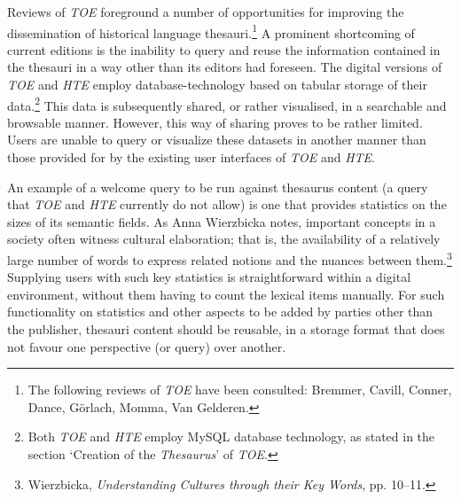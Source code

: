 Reviews of \textit{TOE} foreground a number of opportunities for improving the dissemination of historical language thesauri.\footnote{The following reviews of \textit{TOE} have been consulted: Bremmer, Cavill, Conner, Dance, Görlach, Momma, Van Gelderen.} A prominent shortcoming of current editions is the inability to query and reuse the information contained in the thesauri in a way other than its editors had foreseen. The digital versions of \textit{TOE} and \textit{HTE} employ database-technology based on tabular storage of their data.\footnote{Both \textit{TOE} and \textit{HTE} employ MySQL database technology, as stated in the section `Creation of the \textit{Thesaurus}' of \textit{TOE}.} This data is subsequently shared, or rather visualised, in a searchable and browsable manner. However, this way of sharing proves to be rather limited. 
Users are unable to query or visualize these datasets in another manner than those provided for by the existing user interfaces of \textit{TOE} and \textit{HTE}. 

An example of a welcome query to be run against thesaurus content (a query that \textit{TOE} and \textit{HTE} currently do not allow) is one that provides statistics on the sizes of its semantic fields. As Anna Wierzbicka notes, important concepts in a society often witness cultural elaboration; that is, the availability of a relatively large number of words to express related notions and the nuances between them.\footnote{Wierzbicka, \textit{Understanding Cultures through their Key Words}, pp. 10–11.} Supplying users with such key statistics is straightforward within a digital environment, without them having to count the lexical items manually. %
For such functionality on statistics and other aspects to be added by parties other than the publisher, thesauri content should be reusable, in a storage format that does not favour one perspective (or query) over another.

